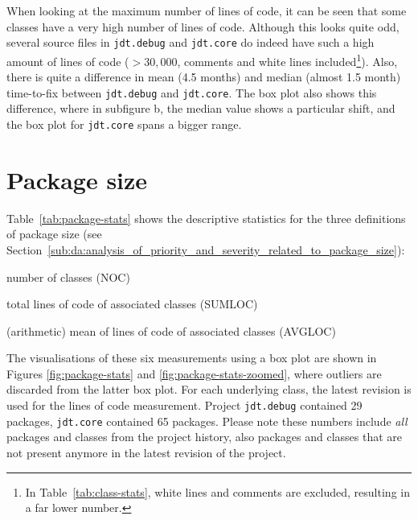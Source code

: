When looking at the maximum number of lines of code, it can be seen that some classes have a very high number of lines of code. Although this looks quite odd, several source files in \texttt{jdt.debug} and \texttt{jdt.core} do indeed have such a high amount of lines of code ($> 30,000$, comments and white lines included\footnote{In Table~\ref{tab:class-stats}, white lines and comments are excluded, resulting in a far lower number.}). Also, there is quite a difference in mean (4.5 months) and median (almost 1.5 month) time-to-fix between \texttt{jdt.debug} and \texttt{jdt.core}. The box plot also shows this difference, where in subfigure b, the median value shows a particular shift, and the box plot for \texttt{jdt.core} spans a bigger range.

\section{Package size} %
\label{sec:descr:package_size}
Table~\ref{tab:package-stats} shows the descriptive statistics for the three definitions of package size (see Section~\ref{sub:da:analysis_of_priority_and_severity_related_to_package_size}):

\begin{enumerate*}
	\item number of classes (NOC)
	\item total lines of code of associated classes (SUMLOC)
	\item (arithmetic) mean of lines of code of associated classes (AVGLOC)
\end{enumerate*}

The visualisations of these six measurements using a box plot are shown in Figures \ref{fig:package-stats} and \ref{fig:package-stats-zoomed}, where outliers are discarded from the latter box plot. For each underlying class, the latest revision is used for the lines of code measurement. Project \texttt{jdt.debug} contained 29 packages, \texttt{jdt.core} contained 65 packages. Please note these numbers include \emph{all} packages and classes from the project history, also packages and classes that are not present anymore in the latest revision of the project.

